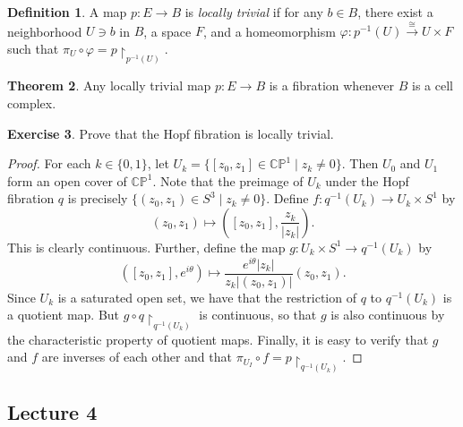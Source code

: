 \documentclass[10pt,letterpaper,cm]{nupset}
\theoremstyle{definition}
\newtheorem{defn}{Definition}[subsection]
\theoremstyle{theorem}
\newtheorem{theorem}[defn]{Theorem}
\newtheorem{exercise}[defn]{Exercise}
\theoremstyle{remark}
\newcommand{\CP}{\mathbb{CP}}
\newcommand{\1}{\mathbb{1}}
\newcommand{\0}{\vec 0}
\begin{document}
\begin{defn}\label{ltriv}
A map $p : E \to B$ is \textit{locally trivial} if for any $b\in B$, there exist a neighborhood $U\ni b$ in $B$, a space $F$, and a homeomorphism $\varphi: p^{-1}(U) \overset{\cong}{\longrightarrow} U \times F$ such that $\pi_U \circ \varphi = p \restriction_{p^{-1}(U)}$.
\end{defn}

\begin{theorem}
Any locally trivial map $p: E \to B$ is a fibration whenever $B$ is a cell complex. 
\end{theorem}

\begin{exercise}
Prove that the Hopf fibration is locally trivial.
\end{exercise}
\begin{proof}
For each $k \in \{0,1\}$, let $U_k = \{[z_0, z_1] \in \CP^1 \mid z_k \ne 0\}$. Then $U_0$ and $U_1$ form an open cover of $\CP^1$. Note that the preimage of $U_k$ under the Hopf fibration $q$ is precisely $\{(z_0, z_1) \in S^3 \mid z_k \ne 0\}$. Define $f: q^{-1}(U_k) \to  U_k \times S^1$ by  $$(z_0, z_1) \mapsto \left([z_0, z_1], \frac{z_k}{|z_k|}\right).$$ This is clearly continuous. Further, define the map $g: U_k \times S^1 \to q^{-1}(U_k)$ by $$\left([z_0, z_1], e^{i{\theta}}\right) \mapsto \frac{e^{i\theta}|z_k|}{z_k \vert{(z_0, z_1)}\rvert}\left(z_0, z_1 \right).$$ Since $U_k$ is a saturated open set, we have that the restriction of $q$ to $q^{-1}(U_k)$ is a quotient map. But $g \circ q\restriction_{q^{-1}(U_k)}$ is continuous, so that $g$ is also continuous by the characteristic property of quotient maps. Finally, it is easy to verify that $g$ and $f$ are inverses of each other and that $\pi_{U_I} \circ f = p\restriction_{q^{-1}(U_k)}$.
\end{proof}

\subsection{Lecture 4}
\end{document}
